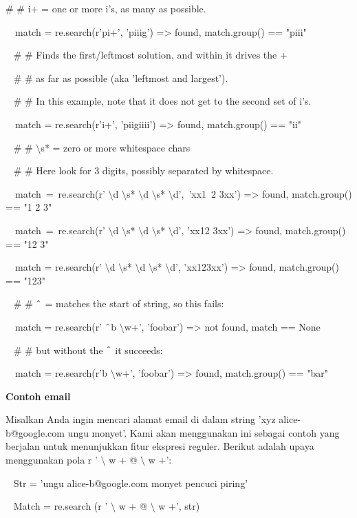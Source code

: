 \begin {enumerate}
\begin {enumerate}
 $  \#  $ $  \#  $ i+ = one or more i's, as many as possible.

~~match = re.search(r'pi+', 'piiig') =>  found, match.group() == "piii"

~  $  \#  $ $  \#  $ Finds the first/leftmost solution, and within it drives the +

~  $  \#  $ $  \#  $ as far as possible (aka 'leftmost and largest').

~  $  \#  $ $  \#  $ In this example, note that it does not get to the second set of i's.

~~match = re.search(r'i+', 'piigiiii') =>  found, match.group() == "ii"

~  $  \#  $ $  \#  $  $  \setminus  $s* = zero or more whitespace chars

~  $  \#  $ $  \#  $ Here look for 3 digits, possibly separated by whitespace.

~~match~=~re.search(r' $  \setminus  $d $  \setminus  $s* $  \setminus  $d $  \setminus  $s* $  \setminus  $d',~'xx1~2   3xx') =>  found, match.group() == "1 2   3"

~~match~=~re.search(r' $  \setminus  $d $  \setminus  $s* $  \setminus  $d $  \setminus  $s* $  \setminus  $d', 'xx12  3xx') =>  found, match.group() == "12  3"

~~match = re.search(r' $  \setminus  $d $  \setminus  $s* $  \setminus  $d $  \setminus  $s* $  \setminus  $d', 'xx123xx') =>  found, match.group() == "123"

~  $  \#  $ $  \#  $  $  \string^  $ = matches the start of string, so this fails:

~~match = re.search(r' $  \string^  $b $  \setminus  $w+', 'foobar') =>  not found, match == None

~  $  \#  $ $  \#  $ but without the  $  \string^  $ it succeeds:

~~match = re.search(r'b $  \setminus  $w+', 'foobar') =>  found, match.group() == "bar"

{\fontsize{14pt}{14pt}\selectfont \textbf{Contoh email} \\} \par
Misalkan Anda ingin mencari alamat email di dalam string 'xyz alice-b@google.com ungu monyet'. Kami akan menggunakan ini sebagai contoh yang berjalan untuk menunjukkan fitur ekspresi reguler. Berikut adalah upaya menggunakan pola r ' $  \setminus  $ w + @  $  \setminus  $ w +': 

~ Str = 'ungu alice-b@google.com monyet pencuci piring'

~ Match = re.search (r ' $  \setminus  $ w + @  $  \setminus  $ w +', str)


\end{enumerate}
\end{enumerate}
